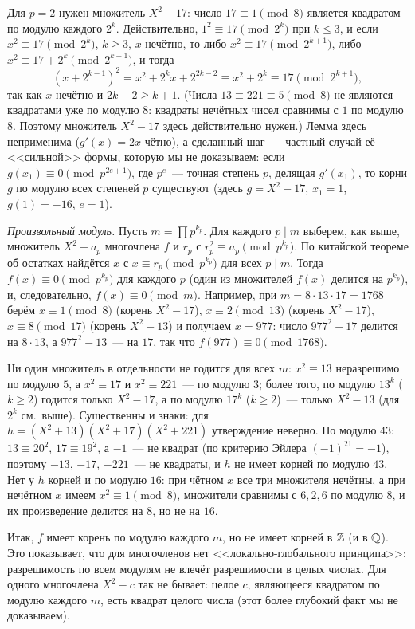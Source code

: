 Для $p=2$ нужен множитель $X^2-17$: число $17\equiv1\pmod8$ является квадратом по модулю каждого $2^k$. Действительно,
$1^2\equiv17\pmod{2^k}$ при $k\le3$, и если $x^2\equiv17\pmod{2^k}$, $k\ge3$, $x$ нечётно, то либо $x^2\equiv17\pmod{2^{k+1}}$,
либо $x^2\equiv17+2^k\pmod{2^{k+1}}$, и тогда
\[
(x+2^{k-1})^2=x^2+2^kx+2^{2k-2}\equiv x^2+2^k\equiv17\pmod{2^{k+1}},
\]
так как $x$ нечётно и $2k-2\ge k+1$. (Числа $13\equiv221\equiv5\pmod8$ не являются квадратами уже по модулю $8$: квадраты
нечётных чисел сравнимы с $1$ по модулю $8$. Поэтому множитель $X^2-17$ здесь действительно нужен.) Лемма 
здесь неприменима ($g'(x)=2x$ чётно), а сделанный шаг~--- частный случай её <<сильной>> формы, которую мы не доказываем:
если $g(x_1)\equiv0\pmod{p^{2e+1}}$, где $p^e$~--- точная степень $p$, делящая $g'(x_1)$, то корни $g$ по модулю всех
степеней $p$ существуют (здесь $g=X^2-17$, $x_1=1$, $g(1)=-16$, $e=1$).

\emph{Произвольный модуль.} Пусть $m=\prod p^{k_p}$. Для каждого $p\mid m$ выберем, как выше, множитель $X^2-a_p$ многочлена
$f$ и $r_p$ с $r_p^2\equiv a_p\pmod{p^{k_p}}$. По китайской теореме об остатках найдётся $x$ с $x\equiv r_p\pmod{p^{k_p}}$ для
всех $p\mid m$. Тогда $f(x)\equiv0\pmod{p^{k_p}}$ для каждого $p$ (один из множителей $f(x)$ делится на $p^{k_p}$), и,
следовательно, $f(x)\equiv0\pmod m$. Например, при $m=8\cdot13\cdot17=1768$ берём
$x\equiv1\pmod8$ (корень $X^2-17$), $x\equiv2\pmod{13}$ (корень $X^2-17$), $x\equiv8\pmod{17}$ (корень $X^2-13$) и
получаем $x=977$: число $977^2-17$ делится на $8\cdot13$, а $977^2-13$~--- на $17$, так что $f(977)\equiv0\pmod{1768}$.

Ни один множитель в отдельности не годится для всех $m$: $x^2\equiv13$ неразрешимо по модулю $5$, а $x^2\equiv17$ и
$x^2\equiv221$~--- по модулю $3$; более того, по модулю $13^k$ ($k\ge2$) годится только $X^2-17$, а по модулю $17^k$
($k\ge2$)~--- только $X^2-13$ (для $2^k$ см.\ выше). Существенны и знаки: для $h=(X^2+13)(X^2+17)(X^2+221)$ утверждение
неверно. По модулю $43$: $13\equiv20^2$, $17\equiv19^2$, а $-1$~--- не квадрат (по критерию Эйлера $(-1)^{21}=-1$),
поэтому $-13$, $-17$, $-221$~--- не квадраты, и $h$ не имеет корней по модулю $43$. Нет у $h$ корней и по модулю $16$:
при чётном $x$ все три множителя нечётны, а при нечётном $x$ имеем $x^2\equiv1\pmod8$, множители сравнимы с $6,2,6$
по модулю $8$, и их произведение делится на $8$, но не на $16$.

Итак, $f$ имеет корень по модулю каждого $m$, но не имеет корней в $\mathbb Z$ (и в $\mathbb Q$). Это показывает, что для многочленов
нет <<локально-глобального принципа>>: разрешимость по всем модулям не влечёт разрешимости в целых числах. Для одного
многочлена $X^2-c$ так не бывает: целое $c$, являющееся квадратом по модулю каждого $m$, есть квадрат целого числа
(этот более глубокий факт мы не доказываем).
